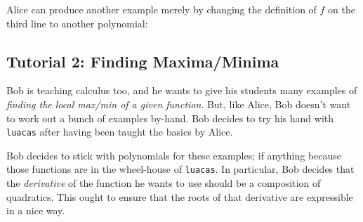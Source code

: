 \documentclass{article}
\begin{document}
Alice can produce another example merely by changing the definition of $f$ on the third line to another polynomial:

\subsection{Tutorial 2: Finding Maxima/Minima}

Bob is teaching calculus too, and he wants to give his students many examples of \emph{finding the local max/min of a given function}. But, like Alice, Bob doesn't want to work out a bunch of examples by-hand. Bob decides to try his hand with \texttt{luacas} after having been taught the basics by Alice. 

Bob decides to stick with polynomials for these examples; if anything because those functions are in the wheel-house of \texttt{luacas}. In particular, Bob decides that the \emph{derivative} of the function he wants to use should be a composition of quadratics. This ought to ensure that the roots of that derivative are expressible in a nice way. 
\end{document}
